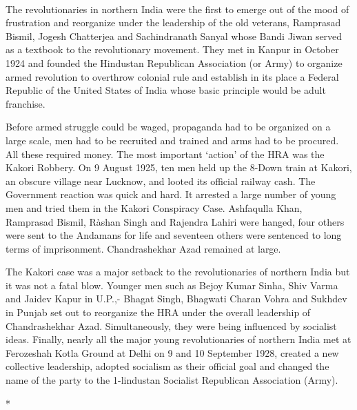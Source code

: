 \paragraph*{}

The revolutionaries in northern India were the first to emerge out of the mood of frustration and reorganize under the leadership of the old veterans, Ramprasad Bismil, Jogesh Chatterjea and Sachindranath Sanyal whose Bandi Jiwan served as a textbook to the revolutionary movement. They met in Kanpur in October 1924 and founded the Hindustan Republican Association (or Army) to organize armed revolution to overthrow colonial rule and establish in its place a Federal Republic of the United States of India whose basic principle would be adult franchise.

Before armed struggle could be waged, propaganda had to be organized on a large scale, men had to be recruited and trained and arms had to be procured. All these required money. The most important `action' of the HRA was the Kakori Robbery. On 9 August 1925, ten men held up the 8-Down train at Kakori, an obscure village near Lucknow, and looted its official railway cash. The Government reaction was quick and hard. It arrested a large number of young men and tried them in the Kakori Conspiracy Case. Ashfaqulla Khan, Ramprasad Bismil, Ràshan Singh and Rajendra Lahiri were hanged, four others were sent to the Andamans for life and seventeen others were sentenced to long terms of imprisonment. Chandrashekhar Azad remained at large.

The Kakori case was a major setback to the revolutionaries of northern India but it was not a fatal blow. Younger men such as Bejoy Kumar Sinha, Shiv Varma and Jaidev Kapur in U.P.,- Bhagat Singh, Bhagwati Charan Vohra and Sukhdev in Punjab set out to reorganize the HRA under the overall leadership of Chandrashekhar Azad. Simultaneously, they were being influenced by socialist ideas. Finally, nearly all the major young revolutionaries of northern India met at Ferozeshah Kotla Ground at Delhi on 9 and 10 September 1928, created a new collective leadership, adopted socialism as their official goal and changed the name of the party to the 1-lindustan Socialist Republican Association (Army).

\begin{center}*\end{center}

\paragraph*{}

